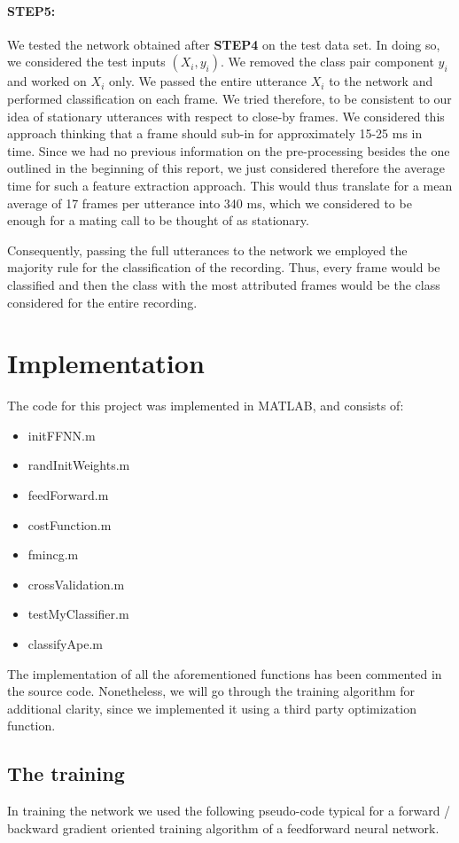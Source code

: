 \documentclass[a4paper,10pt]{article}
\begin{document}
\paragraph{STEP5:}We tested the network obtained after \textbf{STEP4} on the test data set. In doing so, we considered the test inputs $(X_i,y_i)$. We removed the class pair component $y_i$ and worked on $X_i$ only. We passed the entire utterance $X_i$ to the network and performed classification on each frame. We tried therefore, to be consistent to our idea of stationary utterances with respect to close-by frames. We considered this approach thinking that a frame should sub-in for approximately 15-25 ms in time. Since we had no previous information on the pre-processing besides the one outlined in the beginning of this report, we just considered therefore the average time for such a feature extraction approach. This would thus translate for a mean average of 17 frames per utterance into 340 ms, which we considered to be enough for a mating call to be thought of as stationary. 

Consequently, passing the full utterances to the network we employed the majority rule for the classification of the recording. Thus, every frame would be classified and then the class with the most attributed frames would be the class considered for the entire recording.

\section{Implementation}
The code for this project was implemented in MATLAB, and consists of:
\begin{itemize}
\item initFFNN.m
\item randInitWeights.m
\item feedForward.m
\item costFunction.m
\item fmincg.m \cite{fmincg}
\item crossValidation.m
\item testMyClassifier.m
\item classifyApe.m
\end{itemize}

The implementation of all the aforementioned functions has been commented in the source code. Nonetheless, we will go through the training algorithm for additional clarity, since we implemented it using a third party optimization function.

\subsection{The training}
In training the network we used the following pseudo-code typical for a forward / backward gradient oriented training algorithm of a feedforward neural network.
\end{document}
